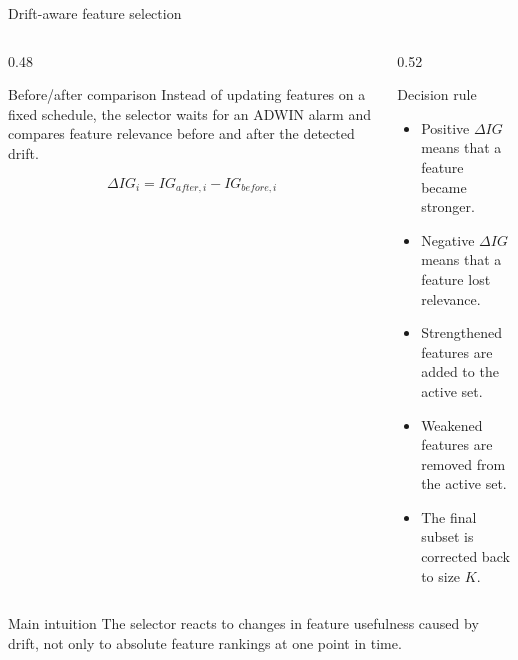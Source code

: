 \documentclass[aspectratio=169,xcolor=dvipsnames]{beamer}
\begin{document}
\begin{frame}{Drift-aware feature selection}
\begin{columns}[T]
    \begin{column}{0.48\textwidth}
        \begin{block}{Before/after comparison}
        \small
        Instead of updating features on a fixed schedule, the selector waits for an ADWIN alarm and compares feature relevance before and after the detected drift.
        \end{block}

        \[
        \Delta IG_i = IG_{after,i} - IG_{before,i}
        \]
    \end{column}

    \begin{column}{0.52\textwidth}
        \begin{block}{Decision rule}
        \small
        \begin{itemize}
            \item Positive $\Delta IG$ means that a feature became stronger.
            \item Negative $\Delta IG$ means that a feature lost relevance.
            \item Strengthened features are added to the active set.
            \item Weakened features are removed from the active set.
            \item The final subset is corrected back to size $K$.
        \end{itemize}
        \end{block}
    \end{column}
\end{columns}

\vspace{0.15cm}
\begin{block}{Main intuition}
\small
The selector reacts to changes in feature usefulness caused by drift, not only to absolute feature rankings at one point in time.
\end{block}
\end{frame}
\end{document}
